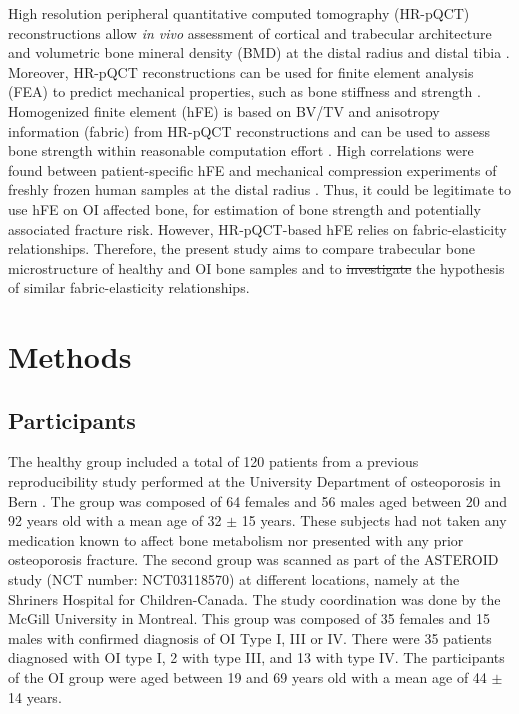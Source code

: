 \documentclass[a4paper,fleqn]{DC_ArtStyle}
\providecommand{\DIFadd}[1]{{\protect\color{blue}{#1}}} %
\providecommand{\DIFdel}[1]{{\protect\color{red}\sout{#1}}}                      %
\providecommand{\DIFaddbegin}{} %
\providecommand{\DIFaddend}{} %
\providecommand{\DIFdelbegin}{} %
\providecommand{\DIFdelend}{} %
\begin{document}
High resolution peripheral quantitative computed tomography (HR-pQCT) reconstructions allow \textit{in vivo} assessment of cortical and trabecular architecture and volumetric bone mineral density (BMD) at the distal radius and distal tibia \cite{Boutroy2005}. Moreover, HR-pQCT reconstructions can be used for finite element analysis (FEA) to predict mechanical properties, such as bone stiffness and strength \cite{Boutroy2008}. Homogenized finite element (hFE) is based on BV/TV and anisotropy information (fabric) from HR-pQCT reconstructions and can be used to assess bone strength within reasonable computation effort \cite{Pahr2009}. High correlations were found between patient-specific hFE and mechanical compression experiments of freshly frozen human samples at the distal radius \cite{Varga2011,AriasMoreno2019}. Thus, it could be legitimate to use hFE on OI affected bone, for estimation of bone strength and potentially associated fracture risk. However, HR-pQCT-based hFE relies on fabric-elasticity relationships. Therefore, the present study aims to compare trabecular bone microstructure of healthy and OI bone samples and to \DIFdelbegin \DIFdel{investigate }\DIFdelend \DIFaddbegin \DIFadd{test }\DIFaddend the hypothesis of similar fabric-elasticity relationships.

\DIFaddbegin 

\DIFaddend \section{Methods}

\subsection{Participants}
The healthy group included a total of 120 patients from a previous reproducibility study performed at the University Department of osteoporosis in Bern \cite{Schenk2020}. The group was composed of 64 females and 56 males aged between 20 and 92 years old with a mean age of 32 $\pm$ 15 years. These subjects had not taken any medication known to affect bone metabolism nor presented with any prior osteoporosis fracture. The second group was scanned as part of the ASTEROID study (NCT number: NCT03118570) at different locations, namely at the Shriners Hospital for Children-Canada. The study coordination was done by the McGill University in Montreal. This group was composed of 35 females and 15 males with confirmed diagnosis of OI Type I, III or IV. There were 35 patients diagnosed with OI type I, 2 with type III, and 13 with type IV. The participants of the OI group were aged between 19 and 69 years old with a mean age of 44 $\pm$ 14 years. 
\end{document}
